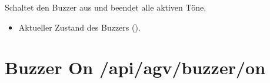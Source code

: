 \documentclass[letterpaper,10pt,english]{sphinxmanual}
\begin{document}
\sphinxAtStartPar
{}
Schaltet den Buzzer aus und beendet alle aktiven Töne.

\sphinxAtStartPar
{}

\begin{sphinxVerbatim}[commandchars=\\\{\}]
\end{sphinxVerbatim}

\sphinxAtStartPar
{}
\begin{itemize}
\item {} 
\sphinxAtStartPar
{}  \textendash{} Aktueller Zustand des Buzzers ().

\end{itemize}


\section{Buzzer On \sphinxhyphen{} /api/agv/buzzer/on}
\label{\detokenize{agv_rest_api_buzzer:buzzer-on-api-agv-buzzer-on}}\label{\detokenize{agv_rest_api_buzzer:post-api-agv-buzzer-on}}
\end{document}
